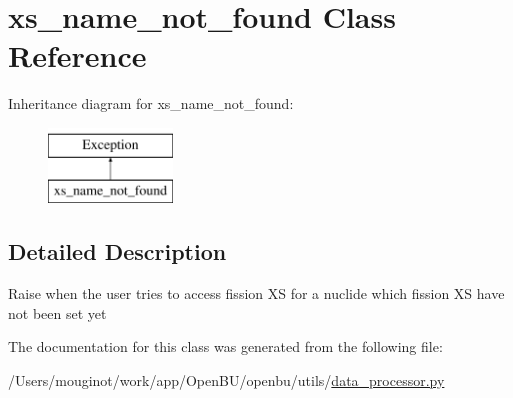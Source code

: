 \hypertarget{classopenbu_1_1utils_1_1data__processor_1_1xs__name__not__found}{}\section{xs\+\_\+name\+\_\+not\+\_\+found Class Reference}
\label{classopenbu_1_1utils_1_1data__processor_1_1xs__name__not__found}
Inheritance diagram for xs\+\_\+name\+\_\+not\+\_\+found\+:\begin{figure}[H]
\begin{center}
\leavevmode
\includegraphics[height=2.000000cm]{classopenbu_1_1utils_1_1data__processor_1_1xs__name__not__found}
\end{center}
\end{figure}


\subsection{Detailed Description}
\begin{DoxyVerb}Raise when the user tries to access fission XS for a nuclide which fission XS have not been set yet \end{DoxyVerb}
 

The documentation for this class was generated from the following file\+:\begin{DoxyCompactItemize}
\item 
/\+Users/mouginot/work/app/\+Open\+B\+U/openbu/utils/\mbox{\hyperlink{data__processor_8py}{data\+\_\+processor.\+py}}\end{DoxyCompactItemize}
